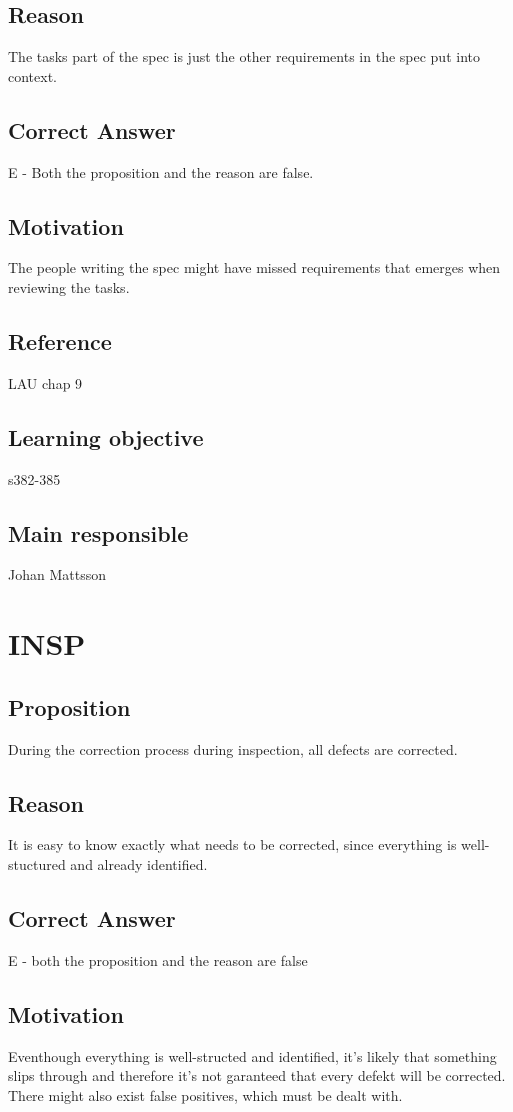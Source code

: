 \documentclass[a4paper]{article}
\begin{document}
\subsection*{Reason}
The tasks part of the spec is just the other requirements in the spec put into context.
\subsection*{Correct Answer}
E - Both the proposition and the reason are false.
\subsection*{Motivation}
The people writing the spec might have missed requirements that emerges when reviewing the tasks.
\subsection*{Reference}
LAU chap 9
\subsection*{Learning objective}
s382-385
\subsection*{Main responsible}
Johan Mattsson

\section{INSP}
\subsection*{Proposition}
During the correction process during inspection, all defects are corrected.
\subsection*{Reason}
 It is easy to know exactly what needs to be corrected, since everything is well-stuctured and already identified.
\subsection*{Correct Answer}
E - both the proposition and the reason are false
\subsection*{Motivation}
Eventhough everything is well-structed and identified, it's likely that something slips through and therefore it's not garanteed that every defekt will be corrected.
There might also exist false positives, which must be dealt with.
\end{document}
